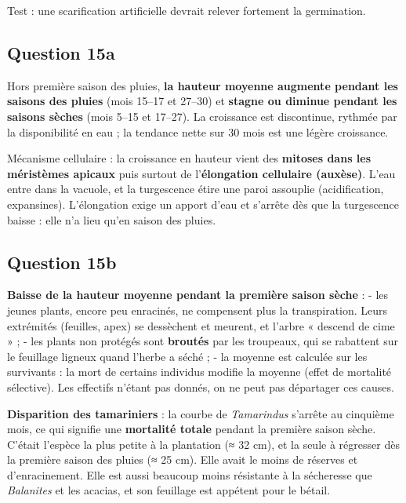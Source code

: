 \documentclass[11pt,a4paper]{article}
\begin{document}
Test : une scarification artificielle devrait relever fortement la germination.

\hypertarget{question-15a}{%
\subsection{Question 15a}\label{question-15a}}

Hors première saison des pluies, \textbf{la hauteur moyenne augmente pendant les saisons des pluies} (mois 15--17 et 27--30) et \textbf{stagne ou diminue pendant les saisons sèches} (mois 5--15 et 17--27). La croissance est discontinue, rythmée par la disponibilité en eau ; la tendance nette sur 30 mois est une légère croissance.

Mécanisme cellulaire : la croissance en hauteur vient des \textbf{mitoses dans les méristèmes apicaux} puis surtout de l'\textbf{élongation cellulaire (auxèse)}. L'eau entre dans la vacuole, et la turgescence étire une paroi assouplie (acidification, expansines). L'élongation exige un apport d'eau et s'arrête dès que la turgescence baisse : elle n'a lieu qu'en saison des pluies.

\hypertarget{question-15b}{%
\subsection{Question 15b}\label{question-15b}}

\textbf{Baisse de la hauteur moyenne pendant la première saison sèche} :
- les jeunes plants, encore peu enracinés, ne compensent plus la transpiration. Leurs extrémités (feuilles, apex) se dessèchent et meurent, et l'arbre « descend de cime » ;
- les plants non protégés sont \textbf{broutés} par les troupeaux, qui se rabattent sur le feuillage ligneux quand l'herbe a séché ;
- la moyenne est calculée sur les survivants : la mort de certains individus modifie la moyenne (effet de mortalité sélective). Les effectifs n'étant pas donnés, on ne peut pas départager ces causes.

\textbf{Disparition des tamariniers} : la courbe de \emph{Tamarindus} s'arrête au cinquième mois, ce qui signifie une \textbf{mortalité totale} pendant la première saison sèche. C'était l'espèce la plus petite à la plantation (≈ 32 cm), et la seule à régresser dès la première saison des pluies (≈ 25 cm). Elle avait le moins de réserves et d'enracinement. Elle est aussi beaucoup moins résistante à la sécheresse que \emph{Balanites} et les acacias, et son feuillage est appétent pour le bétail.
\end{document}
